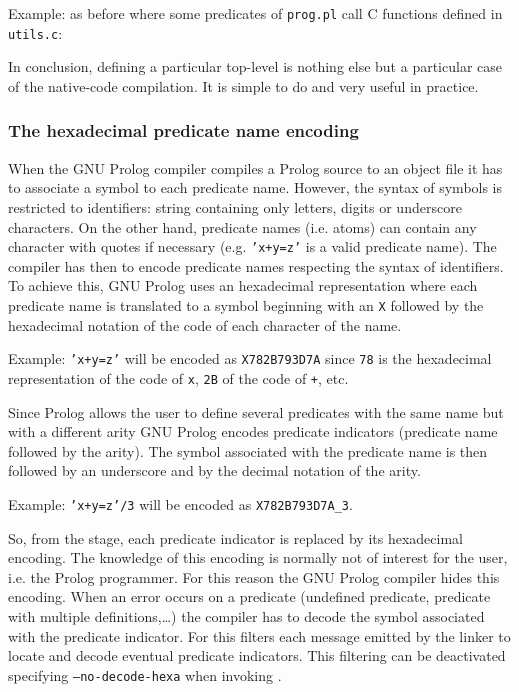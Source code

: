 Example: as before where some predicates of \texttt{prog.pl} call C functions
defined in \texttt{utils.c}:


In conclusion, defining a particular top-level is nothing else but a
particular case of the native-code compilation. It is simple to do and very
useful in practice.

\subsubsection{The hexadecimal predicate name encoding}
\label{The-hexadecimal-predicate-name-encoding}
When the GNU Prolog compiler compiles a Prolog source to an object file it
has to associate a symbol to each predicate name. However, the syntax of
symbols is restricted to identifiers: string containing only letters, digits
or underscore characters. On the other hand, predicate names (i.e. atoms) can
contain any character with quotes if necessary (e.g. \texttt{'x+y=z'} is a
valid predicate name). The compiler has then to encode predicate names
respecting the syntax of identifiers. To achieve this, GNU Prolog uses an
hexadecimal representation where each predicate name is translated to a
symbol beginning with an \texttt{X} followed by the hexadecimal notation of
the code of each character of the name.

Example: \texttt{'x+y=z'} will be encoded as \texttt{X782B793D7A} since
\texttt{78} is the hexadecimal representation of the code of \texttt{x},
\texttt{2B} of the code of \texttt{+}, etc.

Since Prolog allows the user to define several predicates with the same name
but with a different arity GNU Prolog encodes predicate indicators (predicate
name followed by the arity). The symbol associated with the predicate name is
then followed by an underscore and by the decimal notation of the arity.

Example: \texttt{'x+y=z'/3} will be encoded as \texttt{X782B793D7A\_3}.

So, from the  stage, each predicate indicator is replaced
by its hexadecimal encoding. The knowledge of this encoding is normally not
of interest for the user, i.e. the Prolog programmer. For this reason the
GNU Prolog compiler hides this encoding. When an error occurs on a predicate
(undefined predicate, predicate with multiple definitions,\ldots) the
compiler has to decode the symbol associated with the predicate indicator. For
this  filters each message emitted by the linker to locate and
decode eventual predicate indicators. This filtering can be deactivated
specifying \texttt{--no-decode-hexa} when invoking  .

